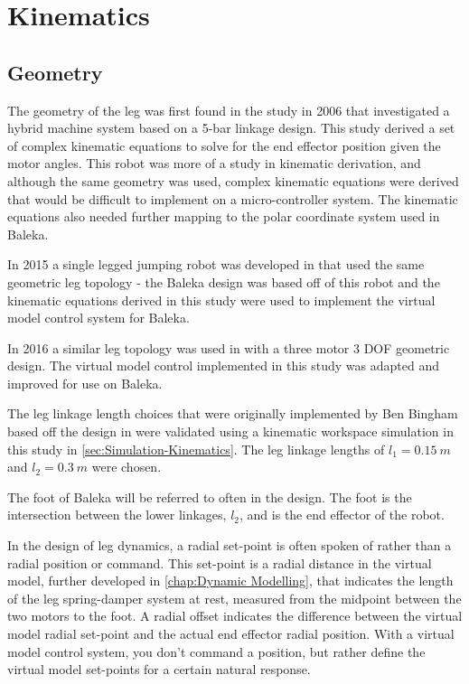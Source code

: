 \chapter{Kinematics}
\label{chap:kinematics}

\section{Geometry}
\label{sec:Geometry}

The geometry of the leg was first found in the study in 2006 \cite{Yu2006} that investigated a hybrid machine system based on a 5-bar linkage design. This study derived a set of complex kinematic equations to solve for the end effector position given the motor angles. This robot was more of a study in kinematic derivation, and although the same geometry was used, complex kinematic equations were derived that would be difficult to implement on a micro-controller system. The kinematic equations also needed further mapping to the polar coordinate system used in Baleka.

In 2015 a single legged jumping robot was developed in \cite{Duperret} that used the same geometric leg topology - the Baleka design was based off of this robot and the kinematic equations derived in this study were used to implement the virtual model control system for Baleka.

In 2016 a similar leg topology was used in \cite{Kalouche2016} with a three motor 3 DOF geometric design. The virtual model control implemented in this study was adapted and improved for use on Baleka.

The leg linkage length choices that were originally implemented by Ben Bingham based off the design in \cite{Duperret} were validated using a kinematic workspace simulation in this study in \cref{sec:Simulation-Kinematics}. The leg linkage lengths of $l_1 = 0.15\ m$ and $l_2 = 0.3\ m$ were chosen.

The foot of Baleka will be referred to often in the design. The foot is the intersection between the lower linkages, $l_2$, and is the end effector of the robot.

In the design of leg dynamics, a radial set-point is often spoken of rather than a radial position or command. This set-point is a radial distance in the virtual model, further developed in \cref{chap:Dynamic Modelling}, that indicates the length of the leg spring-damper system at rest, measured from the midpoint between the two motors to the foot. A radial offset indicates the difference between the virtual model radial set-point and the actual end effector radial position. With a virtual model control system, you don't command a position, but rather define the virtual model set-points for a certain natural response.

